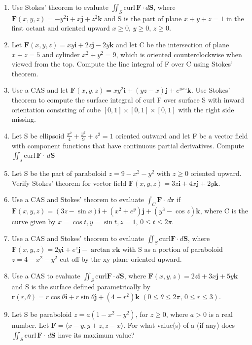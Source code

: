\documentclass{exercises}
\begin{document}
\begin{enumerate}[resume]
\item Use Stokes' theorem to evaluate $\iint_{S}\text{curl}\,\mathbf{F}\cdot d\mathbf{S}$, where $\mathbf{F}(x,y,z)=-y^{2}\mathbf{i}+x\mathbf{j}+z^{2}\mathbf{k}$ and S is the part of plane $x+y+z=1$ in the first octant and oriented upward $x\ge0,\,y\ge0,\,z\ge0$.
\item Let $\mathbf{F}(x,y,z)=xy\mathbf{i}+2z\mathbf{j}-2y\mathbf{k}$ and let C be the intersection of plane $x+z=5$ and cylinder $x^{2}+y^{2}=9$, which is oriented counterclockwise when viewed from the top. Compute the line integral of F over C using Stokes' theorem.
\item \techrequired Use a CAS and let $\mathbf{F}(x,y,z)=xy^{2}\mathbf{i}+(yz-x)\mathbf{j}+e^{yxz}\mathbf{k}$. Use Stokes' theorem to compute the surface integral of curl F over surface S with inward orientation consisting of cube $[0,1]\times [0,1]\times [0,1]$ with the right side missing.
\item Let S be ellipsoid $\frac{x^{2}}{4}+\frac{y^{2}}{9}+z^{2}=1$ oriented outward and let F be a vector field with component functions that have continuous partial derivatives. Compute $\iint_{s}\text{curl}\,\mathbf{F}\cdot \,d\mathbf{S}$
\item Let S be the part of paraboloid $z=9-x^{2}-y^{2}$ with $z\ge0$ oriented upward. Verify Stokes' theorem for vector field $\mathbf{F}(x,y,z)=3z\mathbf{i}+4x\mathbf{j}+2y\mathbf{k}$.
\item \techrequired Use a CAS and Stokes' theorem to evaluate $\int_{C}\mathbf{F}\cdot \,d\mathbf{r}$ if $\mathbf{F}(x,y,z)=(3z-\sin x)\mathbf{i}+(x^{2}+e^{y})\mathbf{j}+(y^{3}-\cos z)\mathbf{k}$, where C is the curve given by $x=\cos t,y=\sin t,z=1$, $0\le t\le2\pi$.
\item \techrequired Use a CAS and Stokes' theorem to evaluate $\iint_{S}\text{curl}\mathbf{F}\cdot d\mathbf{S}$, where $\mathbf{F}(x,y,z)=2y\mathbf{i}+e^{z}\mathbf{j}-\arctan x\mathbf{k}$ with S as a portion of paraboloid $z=4-x^{2}-y^{2}$ cut off by the xy-plane oriented upward.
\item \techrequired Use a CAS to evaluate $\iint_{S}\text{curl}\mathbf{F}\cdot d\mathbf{S}$, where $\mathbf{F}(x,y,z)=2z\mathbf{i}+3x\mathbf{j}+5y\mathbf{k}$ and S is the surface defined parametrically by $\mathbf{r}(r,\theta)=r\cos \theta \mathbf{i}+r\sin \theta \mathbf{j}+(4-r^{2})\mathbf{k}$ $(0\le \theta \le2\pi,\,0\le r\le3)$.
\item Let S be paraboloid $z=a(1-x^{2}-y^{2})$, for $z\ge0$, where $a>0$ is a real number. Let $\mathbf{F}=\langle x-y,y+z,z-x\rangle$. For what value(s) of a (if any) does $\iint_{S}\text{curl}\,\mathbf{F}\cdot \,d\mathbf{S}$ have its maximum value?
\end{enumerate}
\end{document}
